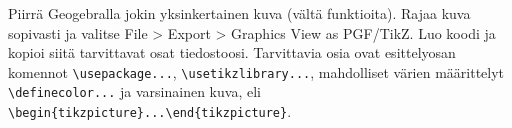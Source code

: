     \begin{harj}
    Piirrä Geogebralla jokin yksinkertainen kuva (vältä funktioita). Rajaa kuva sopivasti ja valitse File > Export > Graphics View as PGF/TikZ. Luo koodi ja kopioi siitä tarvittavat osat tiedostoosi. Tarvittavia osia ovat esittelyosan komennot \lstinline-\usepackage...-, \lstinline-\usetikzlibrary...-, mahdolliset värien määrittelyt \lstinline-\definecolor...- ja varsinainen kuva, eli \lstinline-\begin{tikzpicture}...\end{tikzpicture}-. 
    \end{harj}
